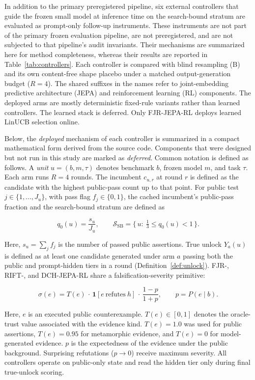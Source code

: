 \documentclass{article}
\numberwithin{equation}{section}  %
\theoremstyle{definition}
\newcommand{\armB}{\textsf{B}}
\begin{document}
In addition to the primary preregistered pipeline, six external controllers that guide the
frozen small model at inference time on the search-bound stratum are evaluated as prompt-only
follow-up instruments. These instruments are not part of the primary frozen evaluation
pipeline, are not preregistered, and are not subjected to that pipeline's audit invariants.
Their mechanisms are summarized here for method completeness, whereas their results are reported
in Table~\ref{tab:controllers}. Each controller is compared with blind resampling (\armB) and
its own content-free shape placebo under a matched output-generation budget ($R{=}4$). The
shared suffixes in the names refer to joint-embedding predictive architecture (JEPA) and
reinforcement learning (RL) components. The deployed arms are mostly deterministic fixed-rule
variants rather than learned controllers. The learned stack is deferred. Only FJR-JEPA-RL
deploys learned LinUCB selection online.

Below, the \emph{deployed} mechanism of each controller is summarized in a compact mathematical
form derived from the source code. Components that were designed but not run in this study are
marked as \emph{deferred}. Common notation is defined as follows. A \emph{unit}
$u=(b,m,\tau)$ denotes benchmark $b$, frozen model $m$, and task $\tau$. Each arm runs
$R{=}4$ rounds. The incumbent $c_{u,r}$ at round $r$ is defined as the candidate with the
highest public-pass count up to that point. For public test $j\in\{1,\dots,J_u\}$, with pass
flag $f_j\in\{0,1\}$, the cached incumbent's public-pass fraction and the search-bound stratum
are defined as


\begin{equation}\label{eq:q0sb}
q_0(u)=\frac{s_u}{J_u},
\qquad
\mathcal{S}_{\mathrm{SB}}=\bigl\{\,u:\ \tfrac{1}{3}\le q_0(u)<1\,\bigr\}.
\end{equation}

Here, $s_u=\sum_j f_j$ is the number of passed public assertions. True unlock $Y_a(u)$ is
defined as at least one candidate generated under arm $a$ passing both the public and
prompt-hidden tiers in a round (Definition~\ref{def:unlock}). \mbox{FJR-,} RIFT-, and
DCH-JEPA-RL share a falsification-severity primitive:

\begin{equation}\label{eq:sev}
\sigma(e)=T(e)\,\cdot\,\mathbf{1}[e\ \text{refutes}\ h]\,\cdot\,\frac{1-p}{1+p},
\qquad p=P(e\mid b).
\end{equation}

Here, $e$ is an executed public counterexample. $T(e)\in[0,1]$ denotes the oracle-trust value
associated with the evidence kind. $T(e)=1.0$ was used for public assertions, $T(e)=0.95$ for
metamorphic evidence, and $T(e)=0$ for model-generated evidence. $p$ is the expectedness of
the evidence under the public background. Surprising refutations ($p\to0$) receive maximum
severity. All controllers operate on public-only state and read the hidden tier only during
final true-unlock scoring.
\end{document}
